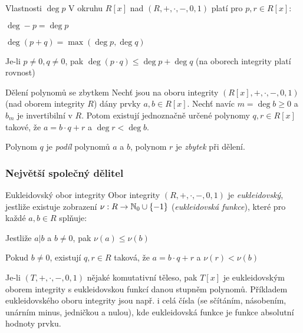 \begin{poznamkaN}{Vlastnosti $\deg p$}
V okruhu $R[x]$ nad $(R,+,\cdot,-,0,1)$ platí pro $p,r\in R[x]$:
\begin{pitemize}
    \item $\deg -p = \deg p$
    \item $\deg (p+q) = \max(\deg p,\deg q)$
    \item Je-li $p\neq 0, q\neq 0$, pak $\deg (p\cdot q)\leq \deg p + \deg q$ (na oborech integrity platí rovnost)
\end{pitemize}
\end{poznamkaN}

\begin{vetaN}{Dělení polynomů se zbytkem}
Nechť jsou na oboru integrity $(R[x],+,\cdot,-,0,1)$ (nad oborem integrity $R$) dány prvky $a,b\in R[x]$. Nechť navíc $m=\deg b\geq 0$ a $b_m$ je invertibilní v $R$. Potom existují jednoznačně určené polynomy $q,r\in R[x]$ takové, že $a=b\cdot q+r$ a $\deg r<\deg b$.
\end{vetaN}

\begin{poznamka}
Polynom $q$ je \emph{podíl} polynomů $a$ a $b$, polynom $r$ je \emph{zbytek} při dělení.
\end{poznamka}

\subsubsection*{Největší společný dělitel}

\begin{definiceN}{Eukleidovský obor integrity}
Obor integrity $(R,+,\cdot,-,0,1)$ je \emph{eukleidovský}, jestliže existuje zobrazení $\nu:R\to \mathbb{N}_0\cup\{-1\}$ (\emph{eukleidovská funkce}), které pro každé $a,b\in R$ splňuje:
\begin{penumerate}
    \item Jestliže $a|b$ a $b\neq 0$, pak $\nu(a)\leq\nu(b)$
    \item Pokud $b\neq 0$, existují $q,r\in R$ taková, že $a=b\cdot q + r$ a $\nu(r)<\nu(b)$
\end{penumerate}
\end{definiceN}

\begin{poznamka}
Je-li $(T,+,\cdot,-,0,1)$ nějaké komutativní těleso, pak $T[x]$ je eukleidovským oborem integrity s eukleidovskou funkcí danou stupněm polynomů. Příkladem eukleidovského oboru integrity jsou např. i celá čísla (se sčítáním, násobením, unárním minus, jedničkou a nulou), kde eukleidovská funkce je funkce absolutní hodnoty prvku.
\end{poznamka}

